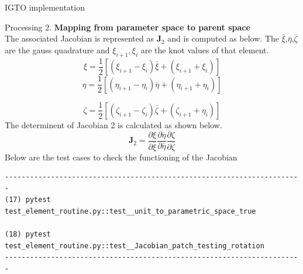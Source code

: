\documentclass[a4paper,12pt,times]{article}
\begin{document}
\begin{section}{IGTO implementation}
\begin{subsection}{Processing}
2. \textbf{ Mapping from parameter space to parent space}
\\ The associated Jacobian is represented as $\mathbf{J}_{2}$ and is computed as below. The $\bar{\xi}$,$\bar{\eta}$,$\bar{\zeta}$ are the gauss quadrature and $\xi_{i+1},\xi_{i}$  are the knot values of that element.
\begin{equation}
\xi=\frac{1}{2}\left[\left(\xi_{i+1}-\xi_{i}\right) \bar{\xi}+\left(\xi_{i+1}+\xi_{i}\right)\right]
\end{equation}
\begin{equation}
\eta=\frac{1}{2}\left[\left(\eta_{i+1}-\eta_{i}\right) \bar{\eta}+\left(\eta_{i+1}+\eta_{i}\right)\right]
\end{equation}

\begin{equation}
\zeta=\frac{1}{2}\left[\left(\zeta_{i+1}-\zeta_{i}\right) \bar{\zeta}+\left(\zeta_{i+1}+\eta_{i}\right)\right]
\end{equation}
The determinent of Jacobian 2 is calculated as shown below.
\begin{equation}\label{J2}
\mathbf{J}_{2}=\frac{\partial \xi}{\partial \bar{\xi}} \frac{\partial \eta}{\partial \bar{\eta}} \frac{\partial \zeta}{\partial \bar{\zeta}}
\end{equation}
Below are the test cases to check the functioning of the Jacobian
\begin{verbatim}
-----------------------------------------------------------------------
(17) pytest test_element_routine.py::test__unit_to_parametric_space_true

(18) pytest test_element_routine.py::test__Jacobian_patch_testing_rotation
-----------------------------------------------------------------------
\end{verbatim}

\end{subsection}
\end{section}
\end{document}
